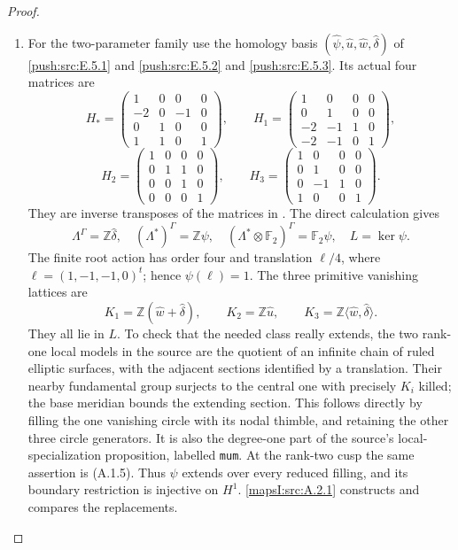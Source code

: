 \begin{proof}
\begin{enumerate}[label=\arabic*.,leftmargin=*]
\item For the two-parameter family use the homology basis
$(\widehat\psi,\widehat u,\widehat w,\widehat\delta)$
of \cref{push:src:E.5.1} and \cref{push:src:E.5.2} and \cref{push:src:E.5.3}.  Its actual four matrices are
\[
 H_* =\begin{pmatrix}1&0&0&0\\-2&0&-1&0\\0&1&0&0\\1&1&0&1\end{pmatrix},
 \qquad
 H_1 =\begin{pmatrix}1&0&0&0\\0&1&0&0\\-2&-1&1&0\\-2&-1&0&1\end{pmatrix},
\]
\[
 H_2 =\begin{pmatrix}1&0&0&0\\0&1&1&0\\0&0&1&0\\0&0&0&1\end{pmatrix},
 \qquad
 H_3 =\begin{pmatrix}1&0&0&0\\0&1&0&0\\0&-1&1&0\\1&0&0&1\end{pmatrix}.
\]
They are inverse transposes of the matrices in
\cite[Proposition 4.2]{mapsVia2}.  The direct
calculation gives
\[
 \Lambda^\Gamma=\mathbb Z\widehat\delta,
 \quad (\Lambda^*)^\Gamma=\mathbb Z\psi,
 \quad (\Lambda^*\otimes\mathbb F_2)^\Gamma
          =\mathbb F_2\psi,
 \quad L=\ker\psi.
 \tag{B.4.1}\label{maps:eq:B.4.1}
\]
The finite root action has order four and translation
$\ell/4$, where $\ell=(1,-1,-1,0)^t$; hence
$\psi(\ell)=1$.  The three primitive vanishing
lattices are
\[
 K_1=\mathbb Z(\widehat w+\widehat\delta),\qquad
 K_2=\mathbb Z\widehat u,\qquad
 K_3=\mathbb Z\langle\widehat w,\widehat\delta\rangle.
 \tag{B.4.2}\label{maps:eq:B.4.2}
\]
They all lie in $L$.  To check that the needed
class really extends, the two rank-one local
models in the source are the quotient of an
infinite chain of ruled elliptic surfaces, with
the adjacent sections identified by a translation.
Their nearby fundamental group surjects to the
central one with precisely $K_i$ killed; the
base meridian bounds the extending section.
This follows directly by filling the one
vanishing circle with its nodal thimble, and
retaining the other three circle generators.
It is also the degree-one part of the source's
local-specialization proposition, labelled
\texttt{mum}.  At the rank-two cusp the same
assertion is (A.1.5).  Thus $\psi$ extends
over every reduced filling, and its boundary
restriction is injective on $H^1$.  \cref{mapsI:src:A.2.1}
constructs and compares the replacements.


\end{enumerate}
\end{proof}
